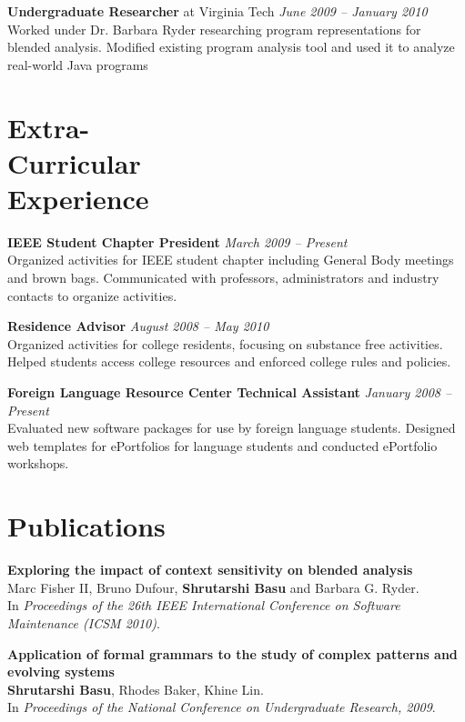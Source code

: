 \documentclass[margin,line]{resume}
\begin{document}
\begin{resume}
    {\bf Undergraduate Researcher} at Virginia Tech \hfill
    {\sl June 2009 -- January 2010}\\
    Worked under Dr. Barbara Ryder researching program representations for
    blended analysis. Modified existing program analysis tool and used it to
    analyze real-world Java programs


    \section{Extra-\\Curricular\\Experience} 

    {\bf IEEE Student Chapter President} \hfill {\sl March 2009 -- Present} \\
    Organized activities for IEEE student chapter including General Body meetings and brown bags.
    Communicated with professors, administrators and industry contacts to organize activities. 

    {\bf Residence Advisor} \hfill {\sl August 2008 -- May 2010} \\
    Organized activities for college residents, focusing on substance free activities. 
    Helped students access college resources and enforced college rules and policies.

    {\bf Foreign Language Resource Center Technical Assistant} \hfill {\sl January 2008 -- Present}\\
    Evaluated new software packages for use by foreign language students.
    Designed web templates for ePortfolios for language students and conducted ePortfolio workshops.


    \section{Publications}
    {\bf Exploring the impact of context sensitivity on blended analysis} \\
    Marc Fisher II, Bruno Dufour, {\bf Shrutarshi Basu} and Barbara G. Ryder.\\
    In \emph{Proceedings of the 26th IEEE International Conference
      on Software Maintenance (ICSM 2010)}.

    {\bf Application of formal grammars to the study of complex patterns and evolving
      systems}\\
    {\bf Shrutarshi Basu}, Rhodes Baker, Khine Lin. \\
    In \emph{Proceedings of the National Conference on Undergraduate Research, 2009}.


\end{resume}
\end{document}
